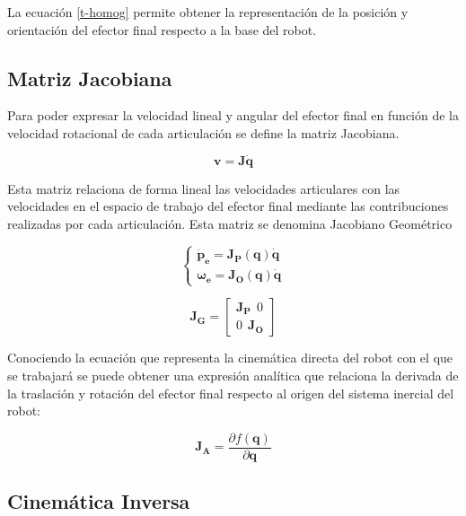 La ecuación \ref{t-homog} permite obtener la representación de la posición
y orientación del efector final respecto a la base del robot.

\subsection{Matriz Jacobiana}

Para poder expresar la velocidad lineal y angular del efector final en
función de la velocidad rotacional de cada articulación se define la matriz
Jacobiana.

\begin{equation}
    \boldsymbol{v} = \boldsymbol{J}\boldsymbol{\dot{q}}
    \label{Jacobian_relation}
\end{equation}

Esta matriz relaciona de forma lineal las velocidades articulares con las
velocidades en el espacio de trabajo del efector final mediante las
contribuciones realizadas por cada articulación. Esta matriz se denomina
Jacobiano Geométrico

\begin{equation}
    \begin{cases}
        \boldsymbol{\dot{p}_e} =
        \boldsymbol{J_P}(\boldsymbol{q})\boldsymbol{\dot{q}} \\
        \boldsymbol{{\omega}_e} =
        \boldsymbol{J_O}(\boldsymbol{q})\boldsymbol{\dot{q}}
    \end{cases}
\end{equation}

\begin{equation}
    \boldsymbol{J_G} = \begin{bmatrix}
        \boldsymbol{J_P} \ \ 0 \\
        0 \ \ \boldsymbol{J_O}
    \end{bmatrix}
\end{equation}

Conociendo la ecuación que representa la cinemática directa del robot con el
que se trabajará se puede obtener una expresión analítica que relaciona la
derivada de la traslación y rotación del efector final respecto al origen del
sistema inercial del robot:

\begin{equation}
    \boldsymbol{J_A} = \frac{\partial f(\boldsymbol{q})}{\partial
        \boldsymbol{q}}
\end{equation}

\subsection{Cinemática Inversa}

